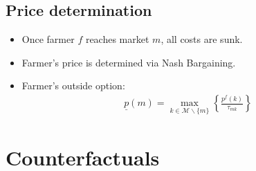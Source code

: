 \documentclass[12pt]{article}
\begin{document}
\subsection{Price determination}
\begin{itemize}
\item Once farmer $f$ reaches market $m$, all costs are sunk.
\item Farmer's price is determined via Nash Bargaining.
\item Farmer's outside option:
\begin{align*}
\underline{p}(m) = \max_{k \in \mathcal{M} \backslash \{m\}} \left\{\frac{p^f(k)}{\tau_{mk}}\right\}
\end{align*}
\end{itemize}





\section{Counterfactuals}
\end{document}

